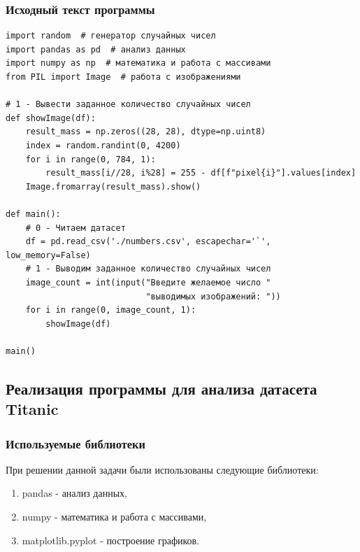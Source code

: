 \documentclass[a4paper]{article}
\begin{document}
\subsubsection{Исходный текст программы}
\normalsize{
    \begin{verbatim}
import random  # генератор случайных чисел
import pandas as pd  # анализ данных
import numpy as np  # математика и работа с массивами
from PIL import Image  # работа с изображениями

# 1 - Вывести заданное количество случайных чисел
def showImage(df):
    result_mass = np.zeros((28, 28), dtype=np.uint8)
    index = random.randint(0, 4200)
    for i in range(0, 784, 1):
        result_mass[i//28, i%28] = 255 - df[f"pixel{i}"].values[index]
    Image.fromarray(result_mass).show()

def main():
    # 0 - Читаем датасет
    df = pd.read_csv('./numbers.csv', escapechar='`', low_memory=False)
    # 1 - Выводим заданное количество случайных чисел
    image_count = int(input("Введите желаемое число " 
                            "выводимых изображений: "))
    for i in range(0, image_count, 1):
        showImage(df)

main()
    \end{verbatim}
}

\subsection{Реализация программы для анализа датасета Titanic}
\subsubsection{Используемые библиотеки}
\normalsize{
    При решении данной задачи были использованы следующие библиотеки:
    \begin{enumerate}
        \item pandas - анализ данных,
        \item numpy - математика и работа с массивами,
        \item matplotlib.pyplot - построение графиков.
    \end{enumerate}
}
\end{document}
